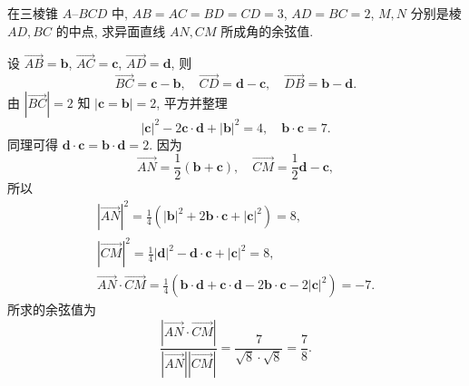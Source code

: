 \lianxi
\begin{exercise}[s]
    在三棱锥 $A\text{--}BCD$ 中, $AB=AC=BD=CD=3$, $AD=BC=2$, $M,N$ 分别是棱 $AD, BC$ 的中点, 求异面直线 $AN,CM$ 所成角的余弦值.
\end{exercise}
\beginsolution
    设 $\overrightarrow{AB}= \bm{b}$, $\overrightarrow{AC}= \bm{c}$, $\overrightarrow{AD}= \bm{d}$, 则
    \[\overrightarrow{BC}= \bm{c}-\bm{b},\quad 
    \overrightarrow{CD}= \bm{d}-\bm{c},\quad 
    \overrightarrow{DB}= \bm{b}-\bm{d}.\]
    由 $|\overrightarrow{BC}|= 2$ 知 $|\bm{c}= \bm{b}|= 2$, 平方并整理
    \[|\bm{c}|^2- 2\bm{c}\cdot\bm{d}+ |\bm{b}|^2= 4,\quad
    \bm{b}\cdot \bm{c}= 7.\]
    同理可得 $\bm{d}\cdot\bm{c}= \bm{b}\cdot\bm{d}= 2$. 因为
    \[\overrightarrow{AN}= \frac12(\bm{b}+\bm{c}),\quad
    \overrightarrow{CM}= \frac12\bm{d}- \bm{c},\]
    所以
    \[\begin{gathered}
        |\overrightarrow{AN}|^2
        = \frac14(|\bm{b}|^2+ 2\bm{b}\cdot\bm{c}+ |\bm{c}|^2)= 8,\\
        |\overrightarrow{CM}|^2
        = \frac14|\bm{d}|^2- \bm{d}\cdot\bm{c}+ |\bm{c}|^2= 8,\\
        \overrightarrow{AN}\cdot \overrightarrow{CM}
        = \frac14(\bm{b}\cdot\bm{d}+ \bm{c}\cdot\bm{d}
            - 2\bm{b}\cdot\bm{c}- 2|\bm{c}|^2)= -7.
    \end{gathered}\]
    所求的余弦值为
    \[\frac{|\overrightarrow{AN}\cdot \overrightarrow{CM}|}{
        |\overrightarrow{AN}| |\overrightarrow{CM}|}
    = \frac{7}{\sqrt8\cdot \sqrt8}= \frac78.\]
\endsolution

      
      
     
